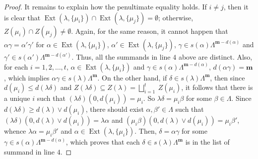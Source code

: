 \documentclass[12pt]{amsart}
\newcommand{\M}{\mathbf{m}}
\theoremstyle{definition}
\theoremstyle{remark}
\newcommand{\Ext}{\operatorname{Ext}}
\begin{document}
\begin{proof}
It remains to explain how the penultimate equality holds. If $i\neq j$, then it is clear that $\Ext(\lambda,\{\mu_i\})\cap \Ext(\lambda,\{\mu_j\})=\emptyset$; otherwise, $Z(\mu_i)\cap Z(\mu_j)\neq \emptyset$. Again, for the same reason, it cannot happen that $\alpha\gamma=\alpha'\gamma'$ for $\alpha\in\Ext(\lambda,\{\mu_i\})$, $\alpha'\in \Ext(\lambda,\{\mu_j\})$, $\gamma\in s(\alpha)\Lambda^{\M-d(\alpha)}$ and $\gamma'\in s(\alpha')\Lambda^{\M-d(\alpha')}$. Thus, all the summands in line $4$ above are distinct. Also, for each $i=1,2,\ldots,t$, $\alpha\in \Ext(\lambda,\{\mu_i\})$ and $\gamma\in s(\alpha)\Lambda^{\M-d(\alpha)}$, $d(\alpha\gamma)=\M$, which implies $\alpha\gamma\in s(\lambda)\Lambda^\M$. On the other hand, if $\delta\in s(\lambda)\Lambda^\M$, then since $d(\mu_i)\le d(\lambda\delta)$ and $Z(\lambda\delta)\subseteq Z(\lambda)=\displaystyle{\bigsqcup_{i=1}^{t}}~Z(\mu_i)$, it follows that there is a unique $i$ such that $(\lambda\delta)(0,d(\mu_i))=\mu_i$. So $\lambda\delta=\mu_i\beta$ for some $\beta\in \Lambda$. Since $d(\lambda\delta)\ge d(\lambda)\vee d(\mu_i)$, there should exist $\alpha,\beta'\in \Lambda$ such that $(\lambda\delta)(0,d(\lambda)\vee d(\mu_i))=\lambda\alpha$ and $(\mu_i\beta)(0,d(\lambda)\vee d(\mu_i))=\mu_i\beta'$, whence $\lambda\alpha=\mu_i\beta'$ and $\alpha\in \Ext(\lambda,\{\mu_i\})$. Then, $\delta=\alpha\gamma$ for some $\gamma\in s(\alpha)\Lambda^{\M-d(\alpha)}$, which proves that each $\delta\in s(\lambda)\Lambda^\M$ is in the list of summand in line $4$. 
\end{proof}
\end{document}

